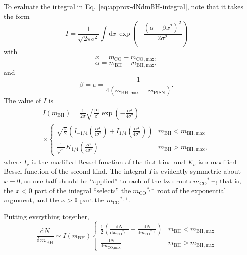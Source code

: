 \documentclass[modern]{aastex631}
\newcommand{\dd}{\ensuremath{\mathrm{d}}}
\newcommand{\mBH}{\ensuremath{m_\mathrm{BH}}}
\newcommand{\mBHMax}{\ensuremath{m_{\mathrm{BH},\mathrm{max}}}}
\newcommand{\mCO}{\ensuremath{m_{\mathrm{CO}}}}
\newcommand{\mCOMax}{\ensuremath{m_{\mathrm{CO},\mathrm{max}}}}
\newcommand{\mPISN}{\ensuremath{m_\mathrm{PISN}}}
\begin{document}
To evaluate the integral in Eq.~\eqref{eq:approx-dNdmBH-integral}, note that it
takes the form 
\begin{equation}
    I = \frac{1}{\sqrt{2 \pi \sigma^2}} \int \dd x \, \exp\left(- \frac{\left( \alpha + \beta x^2 \right)^2}{2 \sigma^2} \right)
\end{equation}
with 
\begin{equation}
    x = \mCO - \mCOMax,
\end{equation}
\begin{equation}
    \alpha = \mBH - \mBHMax,
\end{equation}
and
\begin{equation}
    \beta = a = \frac{1}{4 \left( \mBHMax - \mPISN \right)}.
\end{equation}
The value of $I$ is
\begin{multline}
    I\left( \mBH \right) = \frac{1}{2\sigma} \sqrt{\frac{\left|\alpha\right|}{\beta}} \exp\left( - \frac{\alpha^2}{4 \sigma^2} \right) \\ \times \begin{cases}
        \sqrt{\frac{\pi}{2}} \left( I_{-1/4} \left( \frac{\alpha^2}{4\sigma^2} \right) + I_{1/4} \left( \frac{\alpha^2}{4 \sigma^2} \right) \right) & \mBH < \mBHMax \\
        \frac{1}{\sqrt{\pi}} K_{1/4} \left( \frac{\alpha^2}{4 \sigma^2} \right) & \mBH > \mBHMax,
    \end{cases}
\end{multline}
where $I_\nu$ is the modified Bessel function of the first kind and $K_\nu$ is a
modified Bessel function of the second kind.  The integral $I$ is evidently
symmetric about $x=0$, so one half should be ``applied'' to each of the two
roots $\mCO^{*,\pm}$; that is, the $x<0$ part of the integral ``selects'' the
$\mCO^{*,-}$ root of the exponential argument, and the $x>0$ part the
$\mCO^{*,+}$.  

Putting everything together,
\begin{equation}
    \frac{\dd N}{\dd \mBH} \simeq I\left( \mBH \right) \begin{cases}
        \frac{1}{2} \left( \frac{\dd N}{\dd \mCO^{*,-}} + \frac{\dd N}{\dd \mCO^{*,+}} \right) & \mBH < \mBHMax \\
        \frac{\dd N}{\dd \mCOMax} & \mBH > \mBHMax
    \end{cases}
\end{equation}


\end{document}
